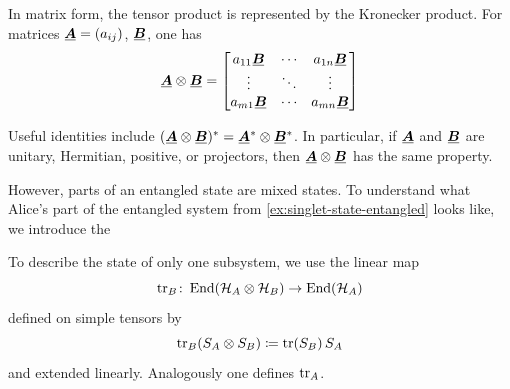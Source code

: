 \begin{digression}
In matrix form, the tensor product is represented by the Kronecker product. For matrices
\(
\matr{A}=(a_{ij})
\),
\(
\matr{B}
\),
one has
\[
\matr{A} \otimes \matr{B}
=
\begin{bmatrix}
a_{11}\matr{B} & \cdots & a_{1n}\matr{B}\\
\vdots  & \ddots & \vdots \\
a_{m1}\matr{B} & \cdots & a_{mn}\matr{B}
\end{bmatrix}
\]

Useful identities include
\(
(\matr{A} \otimes \matr{B})^*  = \matr{A}^* \otimes \matr{B}^* 
\).
In particular, if \(\matr{A}\) and \(\matr{B}\) are unitary, Hermitian, positive, or projectors, then \(\matr{A}\otimes \matr{B}\) has the same property.
\end{digression}

However, parts of an entangled state are mixed states.
To understand what Alice's part of the entangled system from \autoref{ex:singlet-state-entangled} looks like, we introduce the %
\begin{definition}\label{def:partial-trace}
To describe the state of only one subsystem, we use the linear map %
\[
\operatorname{tr}_B \colon \operatorname{End}(\mathcal H_A \otimes \mathcal H_B) \to \operatorname{End}(\mathcal H_A)
\]
defined on simple tensors by
\[
\operatorname{tr}_B(S_A \otimes S_B) \coloneq \operatorname{tr}(S_B)\,S_A
\]
and extended linearly.
Analogously one defines \(\operatorname{tr}_A\).
\end{definition}

